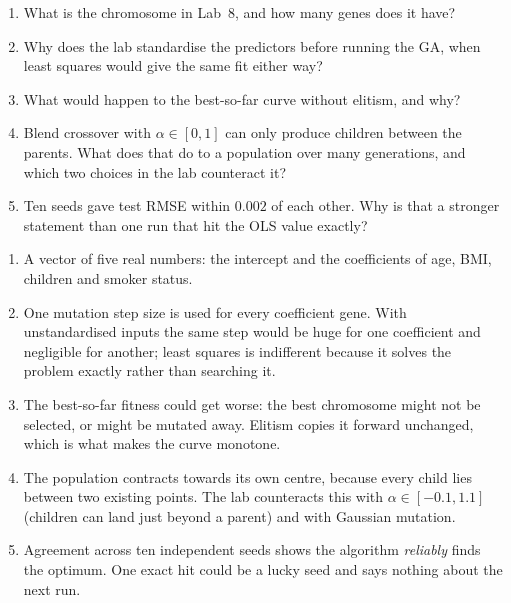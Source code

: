 

\begin{quickcheck}
\begin{enumerate}
  \item What is the chromosome in Lab~8, and how many genes does it have?
  \item Why does the lab standardise the predictors before running the GA, when least squares would give the same fit either way?
  \item What would happen to the best-so-far curve without elitism, and why?
  \item Blend crossover with $\alpha\in[0,1]$ can only produce children between the parents. What does that do to a population over many generations, and which two choices in the lab counteract it?
  \item Ten seeds gave test RMSE within $0.002$ of each other. Why is that a stronger statement than one run that hit the OLS value exactly?
\end{enumerate}
\end{quickcheck}

\begin{checkanswers}
\begin{enumerate}
  \item A vector of five real numbers: the intercept and the coefficients of age, BMI, children and smoker status.
  \item One mutation step size is used for every coefficient gene. With unstandardised inputs the same step would be huge for one coefficient and negligible for another; least squares is indifferent because it solves the problem exactly rather than searching it.
  \item The best-so-far fitness could get worse: the best chromosome might not be selected, or might be mutated away. Elitism copies it forward unchanged, which is what makes the curve monotone.
  \item The population contracts towards its own centre, because every child lies between two existing points. The lab counteracts this with $\alpha\in[-0.1,1.1]$ (children can land just beyond a parent) and with Gaussian mutation.
  \item Agreement across ten independent seeds shows the algorithm \emph{reliably} finds the optimum. One exact hit could be a lucky seed and says nothing about the next run.
\end{enumerate}
\end{checkanswers}
